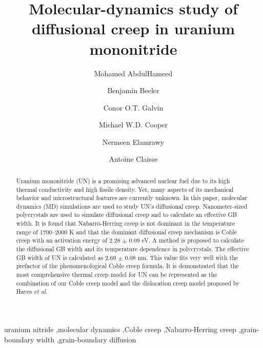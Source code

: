 \documentclass[preprint, 12pt]{elsarticle}
\newcommand{\?}{\stackrel{?}{=}}
\begin{document}
\begin{frontmatter}

\title{Molecular-dynamics study of diffusional creep in uranium mononitride}

\author[ncsu]{Mohamed AbdulHameed}
\author[ncsu,inl]{Benjamin Beeler}
\author[lanl]{Conor O.T. Galvin}
\author[lanl]{Michael W.D. Cooper}
\author[ncsu]{Nermeen Elamrawy}
\author[west]{Antoine Claisse}

\address[ncsu]{Department of Nuclear Engineering, North Carolina State University, Raleigh, NC 27695}
\address[inl]{Idaho National Laboratory, Idaho Falls, ID 83415}
\address[west]{Westinghouse Electric Sweden, Västerås, SE 72163, Sweden}
\address[lanl]{Los Alamos National Laboratory, Los Alamos, NM 87545}

\begin{abstract}

Uranium mononitride (UN) is a promising advanced nuclear fuel due to its high thermal conductivity and high fissile density. Yet, many aspects of its mechanical behavior and microstructural features are currently unknown. In this paper, molecular dynamics (MD) simulations are used to study UN's diffusional creep. Nanometer-sized polycrystals are used to simulate diffusional creep and to calculate an effective GB width. It is found that Nabarro-Herring creep is not dominant in the temperature range of 1700--2000 K and that the dominant diffusional creep mechanism is Coble creep with an activation energy of 2.28 $\pm$ 0.09 eV. A method is proposed to calculate the diffusional GB width and its temperature dependence in polycrystals. The effective GB width of UN is calculated as 2.69 $\pm$ 0.08 nm. This value fits very well with the prefactor of the phenomenological Coble creep formula. It is demonstrated that the most comprehensive thermal creep model for UN can be represented as the combination of our Coble creep model and the dislocation creep model proposed by Hayes \textit{et al.}

\end{abstract}

\begin{keyword}
uranium nitride \sep molecular dynamics \sep Coble creep \sep Nabarro-Herring creep \sep grain-boundary width \sep grain-boundary diffusion
\end{keyword}

\end{frontmatter}
\end{document}

